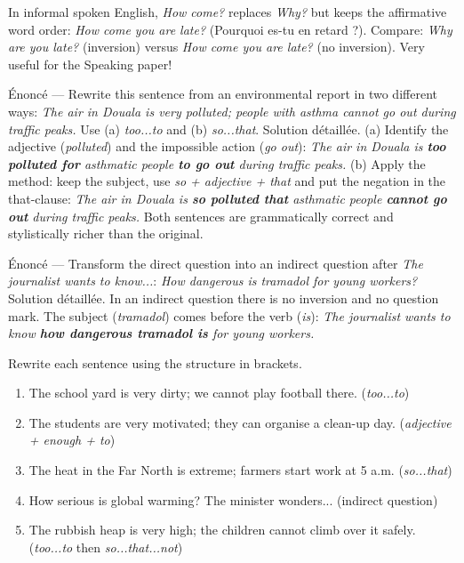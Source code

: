 \documentclass[11pt]{article}
\newcounter{popsec}
\newcounter{popsub}
\newcommand{\courssub}[1]{%
  \stepcounter{popsub}%
  \par\vspace{9pt}\noindent{\popxbold\fontsize{11.5}{13}\selectfont\color{popink}{\color{poporange}\thepopsec.\thepopsub}\hspace{6pt}#1}\par\nopagebreak\vspace{4pt}
}
\begin{document}
\begin{savaistu}
In informal spoken English, \emph{How come?} replaces \emph{Why?} but keeps the affirmative word order: \emph{How come you are late?} (Pourquoi es-tu en retard ?). Compare: \emph{Why are you late?} (inversion) versus \emph{How come you are late?} (no inversion). Very useful for the Speaking paper!
\end{savaistu}

\courssub{Solved Exercise and Guided Practice}

\begin{exoresolu}
Énoncé — Rewrite this sentence from an environmental report in two different ways: \emph{The air in Douala is very polluted; people with asthma cannot go out during traffic peaks.} Use (a) \emph{too...to} and (b) \emph{so...that}.
\tcblower
Solution détaillée.
(a) Identify the adjective (\emph{polluted}) and the impossible action (\emph{go out}): \emph{The air in Douala is \textbf{too polluted for} asthmatic people \textbf{to go out} during traffic peaks.}
(b) Apply the method: keep the subject, use \emph{so + adjective + that} and put the negation in the that-clause: \emph{The air in Douala is \textbf{so polluted that} asthmatic people \textbf{cannot go out} during traffic peaks.}
Both sentences are grammatically correct and stylistically richer than the original.
\end{exoresolu}

\begin{exoresolu}
Énoncé — Transform the direct question into an indirect question after \emph{The journalist wants to know...}: \emph{How dangerous is tramadol for young workers?}
\tcblower
Solution détaillée. In an indirect question there is no inversion and no question mark. The subject (\emph{tramadol}) comes before the verb (\emph{is}): \emph{The journalist wants to know \textbf{how dangerous tramadol is} for young workers.}
\end{exoresolu}

\begin{exercice}
Rewrite each sentence using the structure in brackets.
\begin{enumerate}
\item The school yard is very dirty; we cannot play football there. (\emph{too...to})
\item The students are very motivated; they can organise a clean-up day. (\emph{adjective + enough + to})
\item The heat in the Far North is extreme; farmers start work at 5 a.m. (\emph{so...that})
\item How serious is global warming? The minister wonders... (indirect question)
\item The rubbish heap is very high; the children cannot climb over it safely. (\emph{too...to} then \emph{so...that...not})
\end{enumerate}
\end{exercice}
\end{document}
